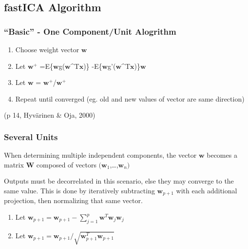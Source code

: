 \documentclass[12pt,twoside]{amherstthesis}
\begin{document}
  \subsection{fastICA Algorithm}\label{fastica-algorithm}
  
  \subsubsection{\texorpdfstring{``Basic'' - One Component/Unit
  Alogrithm}{Basic - One Component/Unit Alogrithm}}\label{basic---one-componentunit-alogrithm}
  
  \begin{enumerate}
  \def\labelenumi{\arabic{enumi}.}
  \item
    Choose weight vector \(\textbf{w}\)
  \item
    Let \(\textbf{w}^+\)
    =E\{\(\textbf{w}\)g(\(\textbf{w}\)\^{}T\(\textbf{x}\))\}
    -E\{\(\textbf{w}\)g'(\(\textbf{w}\)\^{}T\(\textbf{x}\))\}\(\textbf{w}\)
  \item
    Let \(\textbf{w}\) =
    \(\textbf{w}^+\)/\textbar{}\textbar{}\(\textbf{w}^+\)\textbar{}\textbar{}
  \item
    Repeat until converged (eg. old and new values of vector are same
    direction)
  \end{enumerate}
  
  (p 14, Hyvärinen \& Oja, 2000)
  
  \subsubsection{Several Units}\label{several-units}
  
  When determining multiple independent components, the vector
  \(\textbf{w}\) becomes a matrix \(\textbf{W}\) composed of vectors
  \((\textbf{w}_{1}\),\ldots{},\(\textbf{w}_{n})\)
  
  Outputs must be decorrelated in this scenario, else they may converge to
  the same value. This is done by iteratively subtracting
  \(\textbf{w}_{p+1}\) with each additional projection, then normalizing
  that same vector.
  
  \begin{enumerate}
  \def\labelenumi{\arabic{enumi}.}
  \item
    Let
    \(\textbf{w}_{p+1} = \textbf{w}_{p+1} - \sum_{j=1}^p \textbf{w}^T\textbf{w}_{j}\textbf{w}_{j}\)
  \item
    Let
    \(\textbf{w}_{p+1} = \textbf{w}_{p+1}/\sqrt{\textbf{w}_{p+1}^T \textbf{w}_{p+1}}\)
  \end{enumerate}
  
\end{document}
